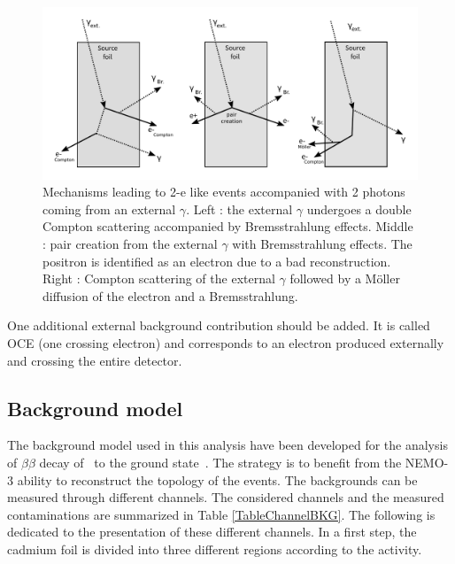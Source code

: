 \documentclass[main.tex]{subfiles}
\begin{document}
\begin{figure}[h!]
\begin{center}
\includegraphics[scale=0.48]{pictures/Chap6/ExternalBkg.pdf}
\end{center}
\caption{Mechanisms leading to 2-e like events accompanied with 2 photons coming from an external $\gamma$. Left : the external $\gamma$ undergoes a double Compton scattering accompanied by Bremsstrahlung effects. Middle : pair creation from the external $\gamma$ with Bremsstrahlung effects. The positron is identified as an electron due to a bad reconstruction. Right : Compton scattering of the external $\gamma$ followed by a M\"oller diffusion of the electron and a Bremsstrahlung.}
\label{ExternalBkgPicture}
\end{figure}


\NI One additional external background contribution should be added. It is called OCE (one crossing electron) and corresponds to an electron produced externally and crossing the entire detector. 


\FloatBarrier


\subsection{Background model}\label{sec:BkgModel}


\NI The background model used in this analysis have been developed for the analysis of $\beta\beta$ decay of \Cd~to the ground state~\cite{Arnold2016bed}. The strategy is to benefit from the NEMO-3 ability to reconstruct the topology of the events. The backgrounds can be measured through different channels. The considered channels and the measured contaminations are summarized in Table \ref{TableChannelBKG}. The following is dedicated to the presentation of these different channels. In a first step, the cadmium foil is divided into three different regions according to the activity. 
\end{document}
